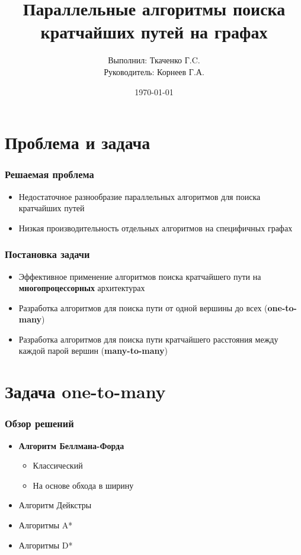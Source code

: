 \documentclass[10pt, compress]{beamer}
\title{Параллельные алгоритмы поиска кратчайших путей на графах}
\subtitle{}
\date{\today}
\author{Выполнил: Ткаченко Г.C. \\ Руководитель: Корнеев Г.А.}
\institute{Университет ИТМО}
\begin{document}
\maketitle

\section{Проблема и задача}
\begin{frame}[fragile]
  \frametitle{Решаемая проблема}

\begin{itemize}
	\item Недостаточное разнообразие параллельных алгоритмов для поиска кратчайших путей

    \item Низкая производительность отдельных алгоритмов на специфичных графах    
  \end{itemize}
\end{frame}

\begin{frame}[fragile]
  \frametitle{Постановка задачи}
\begin{itemize}
    \item Эффективное применение алгоритмов поиска кратчайшего пути на \textbf{многопроцессорных} архитектурах
    \item Разработка алгоритмов для поиска пути от одной вершины до всех (\textbf{one-to-many})
    \item Разработка алгоритмов для поиска пути кратчайшего расстояния между каждой парой вершин (\textbf{many-to-many})
  \end{itemize}
\end{frame}

\section{Задача one-to-many}

\begin{frame}[fragile]
  \frametitle{Обзор решений}
\begin{itemize}
    \item \textbf{Алгоритм Беллмана-Форда}
    \begin{itemize}
    	\item Классический
    	\item На основе обхода в ширину
	\end{itemize}	   
	\item Алгоритм Дейкстры
    \item Алгоритмы A*
    \item Алгоритмы D*
  \end{itemize}
\end{frame}
\end{document}
